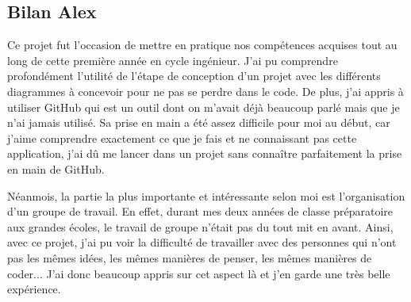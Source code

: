 \subsection{Bilan Alex}

Ce projet fut l’occasion de mettre en pratique nos compétences acquises tout au long de cette première année en cycle ingénieur. J’ai pu comprendre profondément l’utilité de l’étape de conception d’un projet avec les différents diagrammes à concevoir pour ne pas se perdre dans le code. De plus, j’ai appris à utiliser GitHub qui est un outil dont on m’avait déjà beaucoup parlé mais que je n'ai jamais utilisé. Sa prise en main a été assez difficile pour moi au début, car j’aime comprendre exactement ce que je fais et ne connaissant pas cette application, j’ai dû me lancer dans un projet sans connaître parfaitement la prise en main de GitHub.

Néanmois, la partie la plus importante et intéressante selon moi est l'organisation d'un groupe de travail. En effet, durant mes deux années de classe préparatoire aux grandes écoles, le travail de groupe n'était pas du tout mit en avant. Ainsi, avec ce projet, j'ai pu voir la difficulté de travailler avec des personnes qui n'ont pas les mêmes idées, les mêmes manières de penser, les mêmes manières de coder... J'ai donc beaucoup appris sur cet aspect là et j'en garde une très belle expérience.


